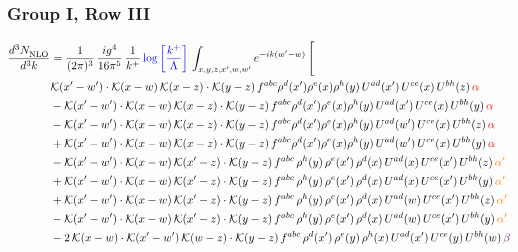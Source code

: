 \documentclass[9pt]{article}
\numberwithin{equation}{section}
\begin{document}
\subsubsection{Group I, Row III}
\begin{align}
    \frac{d^{3}N_{\rm NLO}^{\rm}}{d^{3}k}  & = \frac{1}{(2\pi)^{3}}\, \frac{ig^{4}}{16\pi^{5}}\, \frac{1}{k^{+}}\, {\color{blue}\log{\left[\frac{k^{+}}{\Lambda}\right]}}\, \int_{x,y,z,x^{\prime},w,w^{\prime}}e^{-ik(w^{\prime}-w)}\, \Bigg[\notag \\ & \mathcal{K}(x'-w')\cdot \mathcal{K}(x-w)\, \mathcal{K}(x-z)\cdot \mathcal{K}(y-z)\, f^{abc}\rho^{d}(x')\rho^{e}(x)\rho^{h}(y)\, U^{ad}(x')\,U^{ce}(x)\, U^{bh}(z)\,{\color{red} \alpha}\notag\\ & - \mathcal{K}(x'-w')\cdot \mathcal{K}(x-w)\, \mathcal{K}(x-z)\cdot \mathcal{K}(y-z)\, f^{abc}\rho^{d}(x')\rho^{e}(x)\rho^{h}(y)\, U^{ad}(x')\,U^{ce}(x)\, U^{bh}(y)\,{\color{red} \alpha}\notag \\ &-\mathcal{K}(x'-w')\cdot \mathcal{K}(x-w)\, \mathcal{K}(x-z)\cdot \mathcal{K}(y-z)\, f^{abc}\rho^{d}(x')\rho^{e}(x)\rho^{h}(y)\, U^{ad}(w')\,U^{ce}(x)\, U^{bh}(z)\,{\color{red} \alpha}\notag \\ & +\mathcal{K}(x'-w')\cdot \mathcal{K}(x-w)\, \mathcal{K}(x-z)\cdot \mathcal{K}(y-z)\, f^{abc}\rho^{d}(x')\rho^{e}(x)\rho^{h}(y)\, U^{ad}(w')\,U^{ce}(x)\, U^{bh}(y)\,{\color{red} \alpha}\notag \\ & -\mathcal{K}(x'-w')\cdot\mathcal{K}(x-w)\,\mathcal{K}(x'-z)\cdot\mathcal{K}(y-z)\, f^{abc}\,\rho^{h}(y)\,\rho^{e}(x')\,\rho^{d}(x)\,U^{ad}(x)\,U^{ce}(x')\,U^{bh}(z)\,{\color{orange} \alpha'}\notag \\ &+\mathcal{K}(x'-w')\cdot\mathcal{K}(x-w)\,\mathcal{K}(x'-z)\cdot\mathcal{K}(y-z)\, f^{abc}\,\rho^{h}(y)\,\rho^{e}(x')\,\rho^{d}(x)\,U^{ad}(x)\,U^{ce}(x')\,U^{bh}(y)\,{\color{orange} \alpha'}\notag \\ & +\mathcal{K}(x'-w')\cdot\mathcal{K}(x-w)\,\mathcal{K}(x'-z)\cdot\mathcal{K}(y-z)\, f^{abc}\,\rho^{h}(y)\,\rho^{e}(x')\,\rho^{d}(x)\,U^{ad}(w)\,U^{ce}(x')\,U^{bh}(z)\,{\color{orange} \alpha'}\notag \\ & -\mathcal{K}(x'-w')\cdot\mathcal{K}(x-w)\,\mathcal{K}(x'-z)\cdot\mathcal{K}(y-z)\, f^{abc}\,\rho^{h}(y)\,\rho^{e}(x')\,\rho^{d}(x)\,U^{ad}(w)\,U^{ce}(x')\,U^{bh}(y)\,{\color{orange} \alpha'}\notag \\ & -2\,\mathcal{K}(x-w)\cdot\mathcal{K}(x'-w')\,\mathcal{K}(w-z)\cdot\mathcal{K}(y-z)\, f^{abc}\,\rho^{d}(x')\,\rho^{e}(y)\,\rho^{h}(x)\,U^{ad}(x')\,U^{ce}(y)\,U^{bh}(w)\,{\color{violet} \beta}\notag\\

\end{align}
\end{document}
